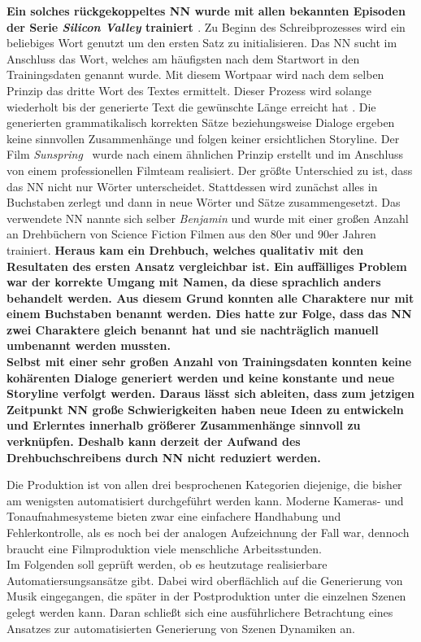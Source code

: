 \documentclass[times, 11pt,twocolumn]{article}
\begin{document}
 \label{sec:SOTAVorverarbeitung}
\textbf{Ein solches rückgekoppeltes NN wurde mit allen bekannten Episoden der Serie \textit{Silicon Valley} trainiert \cite{DrehbuchSV}}. Zu Beginn des Schreibprozesses wird ein beliebiges Wort genutzt um den ersten Satz zu initialisieren. Das NN sucht im Anschluss das Wort, welches am häufigsten nach dem Startwort in den Trainingsdaten genannt wurde. Mit diesem Wortpaar wird nach dem selben Prinzip das dritte Wort des Textes ermittelt. Dieser Prozess wird solange wiederholt bis der generierte Text die gewünschte Länge erreicht hat \cite{DrehbuchWrite}. Die generierten  grammatikalisch korrekten Sätze beziehungsweise Dialoge ergeben keine sinnvollen Zusammenhänge und folgen keiner ersichtlichen Storyline. Der Film \textit{Sunspring}~\cite{DrehbuchMovie} wurde nach einem ähnlichen Prinzip erstellt und im Anschluss von einem professionellen Filmteam realisiert. Der größte Unterschied zu \cite{DrehbuchSV} ist, dass das NN nicht nur Wörter unterscheidet. Stattdessen wird zunächst alles in Buchstaben zerlegt und dann in neue Wörter und Sätze zusammengesetzt. Das verwendete NN nannte sich selber \textit{Benjamin} und wurde mit einer großen Anzahl an Drehbüchern von Science Fiction Filmen aus den 80er und 90er Jahren trainiert. \textbf{Heraus kam ein Drehbuch, welches qualitativ  mit den Resultaten des ersten Ansatz vergleichbar ist. Ein auffälliges Problem war der korrekte Umgang mit Namen, da diese sprachlich anders behandelt werden. Aus diesem Grund konnten alle Charaktere nur mit einem Buchstaben benannt werden. Dies hatte zur Folge, dass das NN zwei Charaktere gleich benannt hat und sie nachträglich manuell umbenannt werden mussten.}\\

\textbf{Selbst mit einer sehr großen Anzahl von Trainingsdaten konnten keine kohärenten Dialoge generiert werden und keine konstante und neue Storyline verfolgt werden.  Daraus lässt sich ableiten, dass zum jetzigen Zeitpunkt NN große Schwierigkeiten haben neue Ideen zu entwickeln und Erlerntes innerhalb größerer Zusammenhänge sinnvoll zu verknüpfen. Deshalb kann derzeit der Aufwand des Drehbuchschreibens durch NN nicht reduziert werden.}

 \label{sec:Produktion}
Die Produktion ist von allen drei besprochenen Kategorien diejenige, die bisher am wenigsten automatisiert durchgeführt werden kann. Moderne Kameras- und Tonaufnahmesysteme bieten zwar eine einfachere Handhabung und Fehlerkontrolle, als es noch bei der analogen Aufzeichnung der Fall war, dennoch braucht eine Filmproduktion viele menschliche Arbeitsstunden. \\
Im Folgenden soll geprüft werden, ob es heutzutage realisierbare Automatiersungsansätze gibt. Dabei wird oberflächlich auf die Generierung von Musik eingegangen, die später in der Postproduktion unter die einzelnen Szenen gelegt werden kann. Daran schließt sich eine ausführlichere Betrachtung eines Ansatzes zur automatisierten Generierung von Szenen Dynamiken an. 
\end{document}
